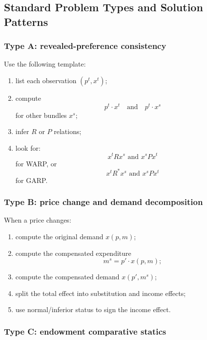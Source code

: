 \subsection{Standard Problem Types and Solution Patterns}

\subsubsection{Type A: revealed-preference consistency}

\begin{examtip}[title={Method Pattern: WARP / GARP problems}]
Use the following template:
\begin{enumerate}
    \item list each observation $(p^t,x^t)$;
    \item compute
    \[
    p^t \cdot x^t
    \quad \text{and} \quad
    p^t \cdot x^s
    \]
    for other bundles $x^s$;
    \item infer $R$ or $P$ relations;
    \item look for:
    \[
    x^t R x^s \text{ and } x^s P x^t
    \]
    for WARP, or
    \[
    x^t R^* x^s \text{ and } x^s P x^t
    \]
    for GARP.
\end{enumerate}
\end{examtip}

\subsubsection{Type B: price change and demand decomposition}

\begin{examtip}[title={Method Pattern: Slutsky questions}]
When a price changes:
\begin{enumerate}
    \item compute the original demand $x(p,m)$;
    \item compute the compensated expenditure
    \[
    m^s = p' \cdot x(p,m);
    \]
    \item compute the compensated demand $x(p',m^s)$;
    \item split the total effect into substitution and income effects;
    \item use normal/inferior status to sign the income effect.
\end{enumerate}
\end{examtip}

\subsubsection{Type C: endowment comparative statics}


